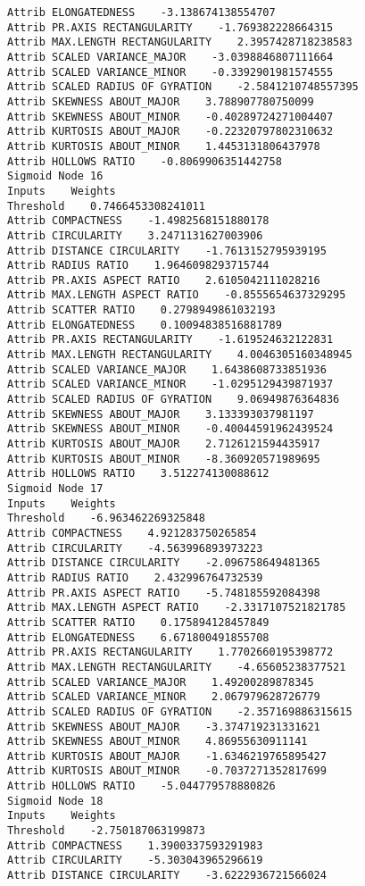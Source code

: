 \documentclass[
	article,			%
	11pt,				%
	oneside,			%
	a4paper,			%
	english,			%
	brazil,				%
	sumario=tradicional
	]{abntex2}
\begin{document}
\begin{lstlisting}
Attrib ELONGATEDNESS    -3.138674138554707
Attrib PR.AXIS RECTANGULARITY    -1.769382228664315
Attrib MAX.LENGTH RECTANGULARITY    2.3957428718238583
Attrib SCALED VARIANCE_MAJOR    -3.0398846807111664
Attrib SCALED VARIANCE_MINOR    -0.3392901981574555
Attrib SCALED RADIUS OF GYRATION    -2.5841210748557395
Attrib SKEWNESS ABOUT_MAJOR    3.788907780750099
Attrib SKEWNESS ABOUT_MINOR    -0.40289724271004407
Attrib KURTOSIS ABOUT_MAJOR    -0.22320797802310632
Attrib KURTOSIS ABOUT_MINOR    1.4453131806437978
Attrib HOLLOWS RATIO    -0.8069906351442758
Sigmoid Node 16
Inputs    Weights
Threshold    0.7466453308241011
Attrib COMPACTNESS    -1.4982568151880178
Attrib CIRCULARITY    3.2471131627003906
Attrib DISTANCE CIRCULARITY    -1.7613152795939195
Attrib RADIUS RATIO    1.9646098293715744
Attrib PR.AXIS ASPECT RATIO    2.6105042111028216
Attrib MAX.LENGTH ASPECT RATIO    -0.8555654637329295
Attrib SCATTER RATIO    0.2798949861032193
Attrib ELONGATEDNESS    0.10094838516881789
Attrib PR.AXIS RECTANGULARITY    -1.619524632122831
Attrib MAX.LENGTH RECTANGULARITY    4.0046305160348945
Attrib SCALED VARIANCE_MAJOR    1.6438608733851936
Attrib SCALED VARIANCE_MINOR    -1.0295129439871937
Attrib SCALED RADIUS OF GYRATION    9.06949876364836
Attrib SKEWNESS ABOUT_MAJOR    3.133393037981197
Attrib SKEWNESS ABOUT_MINOR    -0.40044591962439524
Attrib KURTOSIS ABOUT_MAJOR    2.7126121594435917
Attrib KURTOSIS ABOUT_MINOR    -8.360920571989695
Attrib HOLLOWS RATIO    3.512274130088612
Sigmoid Node 17
Inputs    Weights
Threshold    -6.963462269325848
Attrib COMPACTNESS    4.921283750265854
Attrib CIRCULARITY    -4.563996893973223
Attrib DISTANCE CIRCULARITY    -2.096758649481365
Attrib RADIUS RATIO    2.432996764732539
Attrib PR.AXIS ASPECT RATIO    -5.748185592084398
Attrib MAX.LENGTH ASPECT RATIO    -2.3317107521821785
Attrib SCATTER RATIO    0.175894128457849
Attrib ELONGATEDNESS    6.671800491855708
Attrib PR.AXIS RECTANGULARITY    1.7702660195398772
Attrib MAX.LENGTH RECTANGULARITY    -4.65605238377521
Attrib SCALED VARIANCE_MAJOR    1.49200289878345
Attrib SCALED VARIANCE_MINOR    2.067979628726779
Attrib SCALED RADIUS OF GYRATION    -2.357169886315615
Attrib SKEWNESS ABOUT_MAJOR    -3.374719231331621
Attrib SKEWNESS ABOUT_MINOR    4.86955630911141
Attrib KURTOSIS ABOUT_MAJOR    -1.6346219765895427
Attrib KURTOSIS ABOUT_MINOR    -0.7037271352817699
Attrib HOLLOWS RATIO    -5.044779578880826
Sigmoid Node 18
Inputs    Weights
Threshold    -2.750187063199873
Attrib COMPACTNESS    1.3900337593291983
Attrib CIRCULARITY    -5.303043965296619
Attrib DISTANCE CIRCULARITY    -3.6222936721566024

\end{lstlisting}
\end{document}
